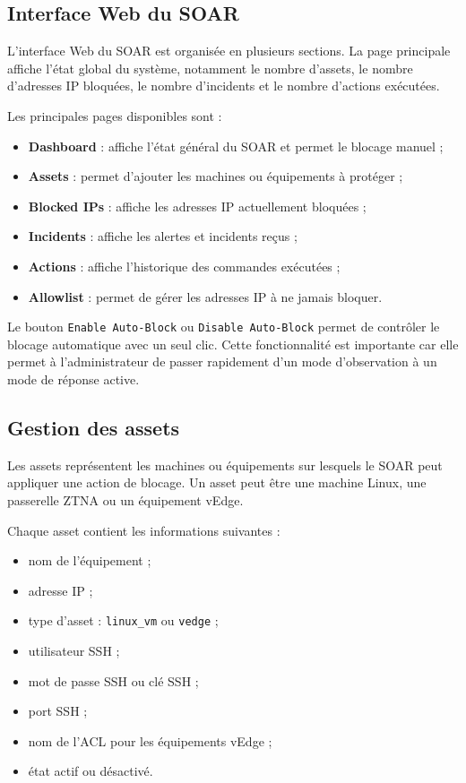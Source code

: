 \documentclass[12pt,a4paper,oneside]{report}
\begin{document}
    \subsection{Interface Web du SOAR}
    
    L'interface Web du SOAR est organisée en plusieurs sections. La page principale affiche l'état global du système, notamment le nombre d'assets, le nombre d'adresses IP bloquées, le nombre d'incidents et le nombre d'actions exécutées.
    
    Les principales pages disponibles sont :
    
    \begin{itemize}
    	\item \textbf{Dashboard} : affiche l'état général du SOAR et permet le blocage manuel ;
    	\item \textbf{Assets} : permet d'ajouter les machines ou équipements à protéger ;
    	\item \textbf{Blocked IPs} : affiche les adresses IP actuellement bloquées ;
    	\item \textbf{Incidents} : affiche les alertes et incidents reçus ;
    	\item \textbf{Actions} : affiche l'historique des commandes exécutées ;
    	\item \textbf{Allowlist} : permet de gérer les adresses IP à ne jamais bloquer.
    \end{itemize}
    
    Le bouton \texttt{Enable Auto-Block} ou \texttt{Disable Auto-Block} permet de contrôler le blocage automatique avec un seul clic. Cette fonctionnalité est importante car elle permet à l'administrateur de passer rapidement d'un mode d'observation à un mode de réponse active.
    
    \subsection{Gestion des assets}
    
    Les assets représentent les machines ou équipements sur lesquels le SOAR peut appliquer une action de blocage. Un asset peut être une machine Linux, une passerelle ZTNA ou un équipement vEdge.
    
    Chaque asset contient les informations suivantes :
    
    \begin{itemize}
    	\item nom de l'équipement ;
    	\item adresse IP ;
    	\item type d'asset : \texttt{linux\_vm} ou \texttt{vedge} ;
    	\item utilisateur SSH ;
    	\item mot de passe SSH ou clé SSH ;
    	\item port SSH ;
    	\item nom de l'ACL pour les équipements vEdge ;
    	\item état actif ou désactivé.
    \end{itemize}
    
\end{document}
